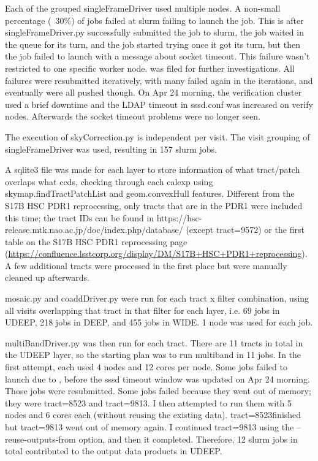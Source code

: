 Each of the grouped singleFrameDriver used multiple nodes. A non-small percentage (~30\%) of jobs failed at slurm failing to launch the job. This is after singleFrameDriver.py successfully submitted the job to slurm, the job waited in the queue for its turn, and the job started trying once it got its turn, but then the job failed to launch with a message about socket timeout. This failure wasn't restricted to one specific worker node. 
 was filed for further investigations. All failures were resubmitted iteratively, with many failed again in the iterations, and eventually were all pushed though.  On Apr 24 morning, the verification cluster used a brief downtime and the LDAP timeout in sssd.conf was increased on verify nodes. Afterwards the socket timeout problems were no longer seen.

The execution of skyCorrection.py is independent per visit. The visit grouping of singleFrameDriver was used, resulting in 157 slurm jobs.

A sqlite3 file was made for each layer to store information of what tract/patch overlaps what ccds, checking through each calexp using skymap.findTractPatchList  and geom.convexHull features. Different from the S17B HSC PDR1 reprocessing, only tracts that are in the PDR1 were included this time; the tract IDs can be found in https://hsc-release.mtk.nao.ac.jp/doc/index.php/database/ (except tract=9572) or the first table on the S17B HSC PDR1 reprocessing page (\url{https://confluence.lsstcorp.org/display/DM/S17B+HSC+PDR1+reprocessing}).  A few additional tracts were processed in the first place but were manually cleaned up afterwards.

mosaic.py and coaddDriver.py were run for each tract x filter combination, using all visits overlapping that tract in that filter for each layer, i.e. 69 jobs in UDEEP, 218 jobs in DEEP, and 455 jobs in WIDE. 1 node was used for each job.

multiBandDriver.py was then run for each tract.  There are 11 tracts in total in the UDEEP layer, so the starting plan was to run multiband in 11 jobs. In the first attempt, each used 4 nodes and 12 cores per node. Some jobs failed to launch due to , before the sssd timeout window was updated on Apr 24 morning. Those jobs were resubmitted.   Some jobs failed because they went out of memory; they were tract=8523 and tract=9813. I then attempted to run them with 5 nodes and 6 cores each (without reusing the existing data).  tract=8523finished but tract=9813 went out of memory again. I continued  tract=9813 using the --reuse-outputs-from option, and then it completed. Therefore, 12 slurm jobs in total contributed to the output data products in UDEEP.

